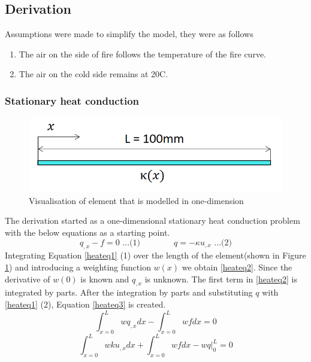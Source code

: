 	\subsection{Derivation}%
	
	Assumptions were made to simplify the model, they were as follows
	\begin{enumerate}
\item{The air on the side of fire follows the temperature of the fire curve.}
\item{The air on the cold side remains at 20\textdegree C.}
	\end{enumerate}
	\subsubsection{Stationary heat conduction}
	\begin{figure}[H]
	\label{femfig}
	\centering
	\includegraphics[width = 0.75\linewidth]{figures/fem_sketch.png}
	\caption{Visualisation of element that is modelled in one-dimension}
	\end{figure}
	The derivation started as a one-dimensional stationary heat conduction problem with the below equations as a starting point.
	\begin{equation}
	\label{heateq1}
	q_{,x}-f = 0  \text{  ...(1)} \quad\quad\quad\quad q = -\kappa u_{,x} \text{  ...(2)} 
	\end{equation}
	Integrating Equation \ref{heateq1} (1) over the length of the element(shown in Figure \ref{femfig}) and introducing a weighting function $w(x)$ we obtain \ref{heateq2}. 
	Since the derivative of $w(0)$ is known and $q_{,x}$ is unknown. 
	The first term in \ref{heateq2} is integrated by parts. 
	After the integration by parts and substituting $q$ with \ref{heateq1} (2), Equation \ref{heateq3} is created.
	\begin{equation}
	\label{heateq2}
	\int_{x=0}^L wq_{,x}dx - \int_{x=0}^L wfdx = 0
	\end{equation}
	\begin{equation}
	\label{heateq3}
	\int_{x=0}^L wku_{,x}dx + \int_{x=0}^L wfdx - \left.wq\right|_0^L = 0
	\end{equation}
